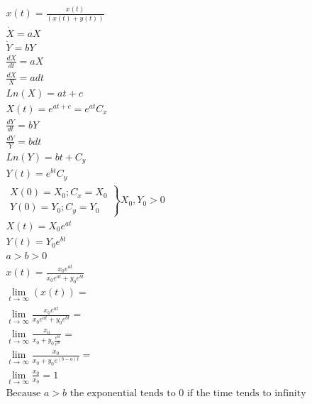 \documentclass[a4paper,10pt]{article}
\begin{document}
\begin{enumerate}
\begin{enumerate}
            \begin{equation}
                \begin{aligned}
                     x(t)=\frac{x(t)}{(x(t)+ y(t))}\\
                     \dot{X}=aX\\
                     \dot{Y}= bY\\
                     \frac{dX}{dt}=aX\\
                     \frac{dX}{X}=adt\\
                     Ln(X)= at + c\\
                     X(t)= e^{at + c}= e^{at}C_{x}\\
                     \frac{dY}{dt}= bY\\
                     \frac{dY}{Y}= bdt\\
                     Ln(Y)= bt + C_{y}\\
                     Y(t)= e^{bt}C_{y}\\
                    \left.
                    \begin{array}{rcl}
                        X(0)= X_{0}; C_{x}= X_{0}
                      \\Y(0)=Y_{0}; C_{y}= Y_{0}
                    \end{array}
                    \right\}
                    X_{0}, Y_{0} > 0\\
                    X(t)= X_{0}e^{at}\\
                    Y(t)= Y_{0}e^{bt}\\
                    a>b>0\\
                    x(t)= \frac{x_{0}e^{at}}{x_{0}e^{at}+y_{0}e^{bt}}\\
                    \lim_{t \to \infty}(x(t))=\\
                    \lim_{t \to \infty}\frac{x_{0}e^{at}}{x_{0}e^{at}+y_{0}e^{bt}}=\\
                    \lim_{t \to \infty}\frac{x_{0}}{x_{0}+y_{0}\frac{e^{bt}}{e^{at}}}=\\
                    \lim_{t \to \infty}\frac{x_{0}}{x_{0} + y_{0}e^{(b-a)t}}=\\
                    \lim_{t \to \infty}\frac{x_{0}}{x_{0}}= 1\\
                    \text{Because }a>b\text{ the exponential tends to 0 if the time tends to infinity}
                \end{aligned}
            \end{equation}

\end{enumerate}
\end{enumerate}
\end{document}
